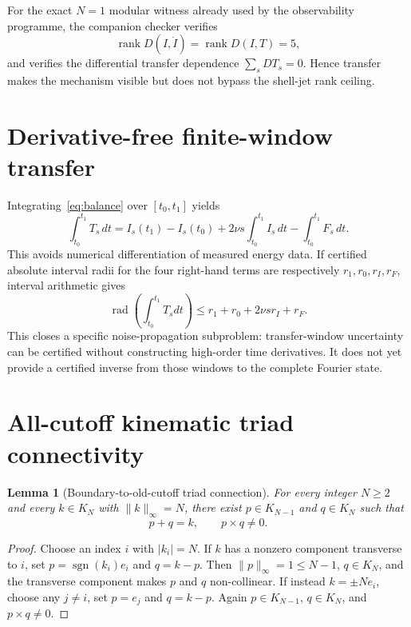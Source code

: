 \documentclass[11pt]{article}
\newtheorem{lemma}[theorem]{Lemma}
\theoremstyle{definition}
\begin{document}
For the exact $N=1$ modular witness already used by the observability programme, the companion
checker verifies
\[
\operatorname{rank}D(I,\dot I)=\operatorname{rank}D(I,T)=5,
\]
and verifies the differential transfer dependence $\sum_sDT_s=0$.  Hence transfer makes the
mechanism visible but does not bypass the shell-jet rank ceiling.

\section{Derivative-free finite-window transfer}

Integrating~\eqref{eq:balance} over $[t_0,t_1]$ yields
\begin{equation}\label{eq:window}
\boxed{
\int_{t_0}^{t_1}T_s\,dt
=I_s(t_1)-I_s(t_0)
+2\nu s\int_{t_0}^{t_1}I_s\,dt
-\int_{t_0}^{t_1}F_s\,dt.
}
\end{equation}
This avoids numerical differentiation of measured energy data.  If certified absolute interval
radii for the four right-hand terms are respectively $r_1,r_0,r_I,r_F$, interval arithmetic gives
\begin{equation}\label{eq:windowrad}
\boxed{
\operatorname{rad}\!\left(\int_{t_0}^{t_1}T_sdt\right)
\le r_1+r_0+2\nu s r_I+r_F.
}
\end{equation}
This closes a specific noise-propagation subproblem: transfer-window uncertainty can be certified
without constructing high-order time derivatives.  It does not yet provide a certified inverse
from those windows to the complete Fourier state.

\section{All-cutoff kinematic triad connectivity}

\begin{lemma}[Boundary-to-old-cutoff triad connection]\label{lem:connect}
For every integer $N\ge2$ and every $k\in K_N$ with $\|k\|_\infty=N$, there exist
$p\in K_{N-1}$ and $q\in K_N$ such that
\[
p+q=k,\qquad p\times q\ne0.
\]
\end{lemma}

\begin{proof}
Choose an index $i$ with $|k_i|=N$.  If $k$ has a nonzero component transverse to $i$, set
$p=\operatorname{sgn}(k_i)e_i$ and $q=k-p$.  Then $\|p\|_\infty=1\le N-1$, $q\in K_N$, and the
transverse component makes $p$ and $q$ non-collinear.  If instead $k=\pm Ne_i$, choose any
$j\ne i$, set $p=e_j$ and $q=k-p$.  Again $p\in K_{N-1}$, $q\in K_N$, and $p\times q\ne0$.
\end{proof}
\end{document}
